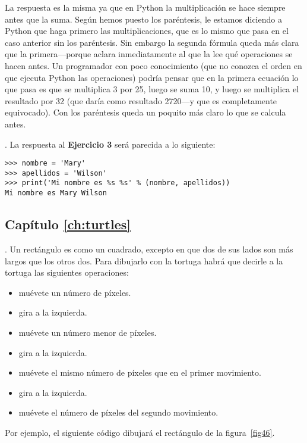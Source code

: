 \noindent
La respuesta es la misma ya que en Python la multiplicación se hace siempre antes que la suma. Según hemos puesto los paréntesis, le estamos diciendo a Python que haga primero las multiplicaciones, que es lo mismo que pasa en el caso anterior sin los paréntesis.  Sin embargo la segunda fórmula queda más clara que la primera---porque aclara inmediatamente al que la lee qué operaciones se hacen antes.   Un programador con poco conocimiento (que no conozca el orden en que ejecuta Python las operaciones) podría pensar que en la primera ecuación lo que pasa es que se multiplica 3 por 25, luego se suma 10, y luego se multiplica el resultado por 32 (que daría como resultado 2720---y que es completamente equivocado).   Con los paréntesis queda un poquito más claro lo que se calcula antes.

.  La respuesta al \textbf{Ejercicio 3} será parecida a lo siguiente:

\begin{listing}
\begin{verbatim}
>>> nombre = 'Mary'
>>> apellidos = 'Wilson'
>>> print('Mi nombre es %s %s' % (nombre, apellidos))
Mi nombre es Mary Wilson
\end{verbatim}
\end{listing}

\subsection*{Capítulo \ref{ch:turtles}}

. Un rectángulo es como un cuadrado, excepto en que dos de sus lados son más largos que los otros dos.   Para dibujarlo con la tortuga habrá que decirle a la tortuga las siguientes operaciones:

\begin{itemize}
 \item muévete un número de píxeles.
 \item gira a la izquierda.
 \item muévete un número menor de píxeles.
 \item gira a la izquierda.
 \item muévete el mismo número de píxeles que en el primer movimiento.
 \item gira a la izquierda.
 \item muévete el número de píxeles del segundo movimiento.
\end{itemize}

\noindent
Por ejemplo, el siguiente código dibujará el rectángulo de la figura~\ref{fig46}.

